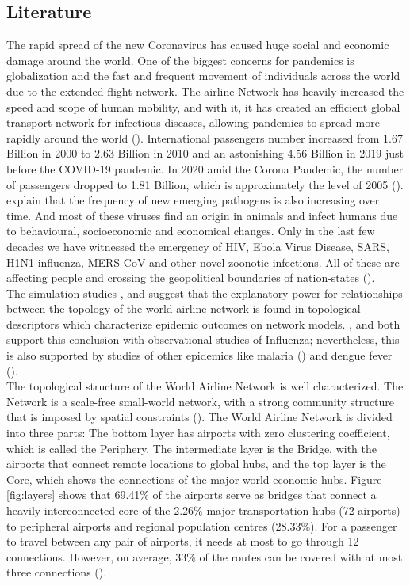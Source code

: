 \documentclass{Resources/netsci-project}
\begin{document}
\subsection{Literature}
The rapid spread of the new Coronavirus has caused huge social and economic damage around the world. One of the biggest concerns for pandemics is globalization and the fast and frequent movement of individuals across the world due to the extended flight network. The airline Network has heavily increased the speed and scope of human mobility, and with it, it has created an efficient global transport network for infectious diseases, allowing pandemics to spread more rapidly around the world (\cite{Lawyer2016}). International passengers number increased from 1.67 Billion in 2000 to 2.63 Billion in 2010 and an astonishing 4.56 Billion in 2019 just before the COVID-19 pandemic. In 2020 amid the Corona Pandemic, the number of passengers dropped to 1.81 Billion, which is approximately the level of 2005 (\cite{WorldBank}). \\
\cite{Morse2012} explain that the frequency of new emerging pathogens is also increasing over time. And most of these viruses find an origin in animals and infect humans due to behavioural, socioeconomic and economical changes. 
Only in the last few decades we have witnessed the emergency of HIV, Ebola Virus Disease, SARS, H1N1 influenza, MERS-CoV and other novel zoonotic infections. All of these are affecting people and crossing the geopolitical boundaries of nation-states (\cite{MartinBoland2018}).\\
The simulation studies \cite{Colizza2006}, and \cite{Colizza2007} suggest that the explanatory power for relationships between the topology of the world airline network is found in topological descriptors which characterize epidemic outcomes on network models. \cite{Balcan2009}, and \cite{Brockmann2013} both support this conclusion with observational studies of Influenza; nevertheless, this is also supported by studies of other epidemics like malaria (\cite{Hunag2013}) and dengue fever (\cite{Semanza2014}).\\
The topological structure of the World Airline Network is well characterized. The Network is a scale-free small-world network, with a strong community structure that is imposed by spatial constraints (\cite{Lawyer2016, Barrat2005}). The World Airline Network is divided into three parts: The bottom layer has airports with zero clustering coefficient, which is called the Periphery. The intermediate layer is the Bridge, with the airports that connect remote locations to global hubs, and the top layer is the Core, which shows the connections of the major world economic hubs. Figure \ref{fig:layers} shows that 69.41\% of the airports serve as bridges that connect a heavily interconnected core of the 2.26\% major transportation hubs (72 airports) to peripheral airports and regional population centres (28.33\%). For a passenger to travel between any pair of airports, it needs at most to go through 12 connections. However, on average, 33\% of the routes can be covered with at most three connections (\cite{Verma2014}).
\end{document}
